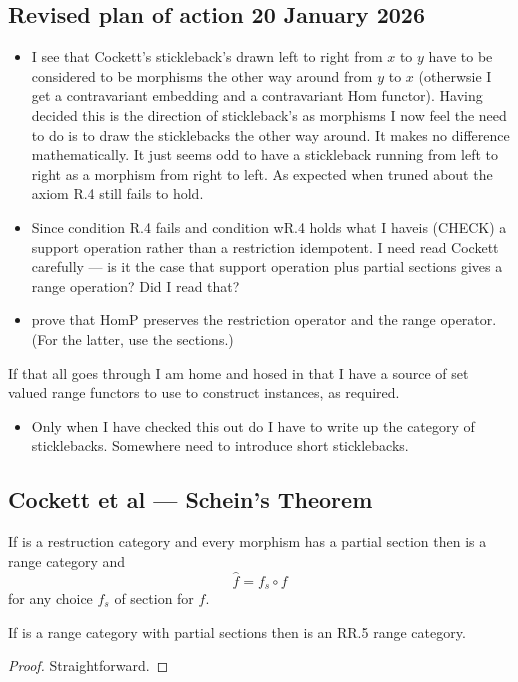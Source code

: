 \subsection{Revised plan of action 20 January 2026}
\begin{itemize}
\item I see that Cockett's stickleback's drawn left to right from $x$ to $y$ have to be considered to be morphisms the other way around from $y$ to $x$ (otherwsie I get a contravariant embedding and a contravariant Hom functor).
Having decided this is the direction of stickleback's as morphisms  I now feel the need to do is to draw the sticklebacks the other way around. It makes  no difference mathematically. It just seems odd to have a stickleback running from left to right as a morphism from right to left. As expected when truned about the axiom R.4 still fails to hold. 
\item Since condition R.4 fails and condition wR.4 holds what I haveis (CHECK) a support operation rather than a restriction idempotent. 
I need read Cockett carefully --- is it the case that support operation plus partial sections gives a range operation? Did I read that?  

\item prove that HomP preserves the restriction operator and the range operator. 
(For the latter, use the sections.) 
\end{itemize}
If that all goes through I am home and hosed in that I have a source of set valued range functors
to use to construct instances, as required.
\begin{itemize}
\item Only when I have checked this out do I have to write up the category of sticklebacks. Somewhere need to introduce short sticklebacks.
\end{itemize}

\subsection{Cockett et al --- Schein's Theorem}
\begin{lemma}[Cockett et al]
If \catcw is a restruction category
and every morphism has a partial section then
\catcw is a range category and
\[\widehat{f} = f_s \circ f\]
for any choice $f_s$ of section for $f$.
\end{lemma}

\begin{lemma}[Cockett et al]
If \catcw is a range category with partial sections then \catcw is an RR.5 range category.
\end{lemma}
\begin{proof}
Straightforward.
\end{proof}

